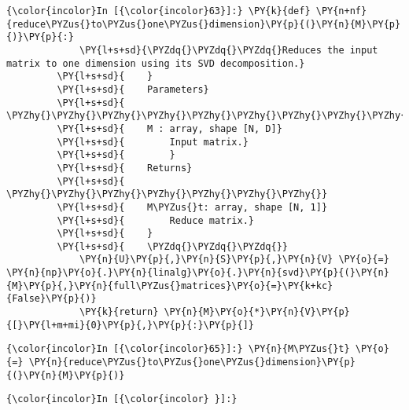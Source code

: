     \begin{Verbatim}[commandchars=\\\{\}]
{\color{incolor}In [{\color{incolor}63}]:} \PY{k}{def} \PY{n+nf}{reduce\PYZus{}to\PYZus{}one\PYZus{}dimension}\PY{p}{(}\PY{n}{M}\PY{p}{)}\PY{p}{:}
             \PY{l+s+sd}{\PYZdq{}\PYZdq{}\PYZdq{}Reduces the input matrix to one dimension using its SVD decomposition.}
         \PY{l+s+sd}{    }
         \PY{l+s+sd}{    Parameters}
         \PY{l+s+sd}{    \PYZhy{}\PYZhy{}\PYZhy{}\PYZhy{}\PYZhy{}\PYZhy{}\PYZhy{}\PYZhy{}\PYZhy{}\PYZhy{}}
         \PY{l+s+sd}{    M : array, shape [N, D]}
         \PY{l+s+sd}{        Input matrix.}
         \PY{l+s+sd}{        }
         \PY{l+s+sd}{    Returns}
         \PY{l+s+sd}{    \PYZhy{}\PYZhy{}\PYZhy{}\PYZhy{}\PYZhy{}\PYZhy{}\PYZhy{}}
         \PY{l+s+sd}{    M\PYZus{}t: array, shape [N, 1]}
         \PY{l+s+sd}{        Reduce matrix.}
         \PY{l+s+sd}{    }
         \PY{l+s+sd}{    \PYZdq{}\PYZdq{}\PYZdq{}}
             \PY{n}{U}\PY{p}{,}\PY{n}{S}\PY{p}{,}\PY{n}{V} \PY{o}{=} \PY{n}{np}\PY{o}{.}\PY{n}{linalg}\PY{o}{.}\PY{n}{svd}\PY{p}{(}\PY{n}{M}\PY{p}{,}\PY{n}{full\PYZus{}matrices}\PY{o}{=}\PY{k+kc}{False}\PY{p}{)}
             \PY{k}{return} \PY{n}{M}\PY{o}{*}\PY{n}{V}\PY{p}{[}\PY{l+m+mi}{0}\PY{p}{,}\PY{p}{:}\PY{p}{]}
\end{Verbatim}

    \begin{Verbatim}[commandchars=\\\{\}]
{\color{incolor}In [{\color{incolor}65}]:} \PY{n}{M\PYZus{}t} \PY{o}{=} \PY{n}{reduce\PYZus{}to\PYZus{}one\PYZus{}dimension}\PY{p}{(}\PY{n}{M}\PY{p}{)}
\end{Verbatim}

    \begin{Verbatim}[commandchars=\\\{\}]
{\color{incolor}In [{\color{incolor} }]:} 
\end{Verbatim}


    
    
